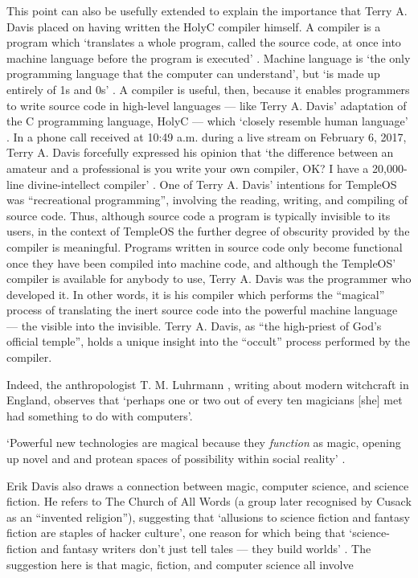 This point can also be usefully extended to explain
the importance that Terry A. Davis placed
on having written the HolyC compiler himself.
A compiler is a program which `translates a whole program, called the
source code, at once into machine language before the program is executed'
\parencite[323]{Computers}.
Machine language is `the only programming language that the computer can
understand', but `is made up entirely of 1s and 0s'
\parencite[321]{Computers}.
A compiler is useful, then, because it enables programmers to write
source code in high-level languages --- like Terry A. Davis' adaptation of the C
programming language, HolyC --- which `closely resemble human language'
\parencite[323]{Computers}.
In a phone call received at 10:49 a.m. during a live stream
on February 6, 2017, Terry A. Davis  forcefully expressed his opinion that
`the difference between an amateur and a professional is you write your
own compiler, OK? I have a 20,000-line divine-intellect compiler'
\parencite[31:44]{Telephone}.
One of Terry A. Davis' intentions for TempleOS was
``recreational programming'', involving the reading, writing,
and compiling of source code.
Thus, although source code a program is typically invisible to its users,
in the context of TempleOS the further degree of obscurity
provided by the compiler is meaningful.
Programs written in source code only become functional
once they have been compiled into machine code, and although the TempleOS'
compiler is available for anybody to use, Terry A. Davis was the programmer
who developed it.
In other words, it is his compiler which performs the ``magical'' process
of translating the inert source code into the powerful
machine language --- the visible into the invisible.
Terry A. Davis, as ``the high-priest of God's official temple'',
holds a unique insight into the ``occult'' process performed by the compiler.

Indeed, the anthropologist T. M. Luhrmann \parencite*[106]{Luhrmann89},
writing about modern witchcraft in England, observes that
`perhaps one or two out of every ten magicians [she] met
had something to do with computers'.




`Powerful new technologies are magical because they \textit{function}
as magic, opening up novel and and protean spaces of possibility
within social reality' \parencite[181]{Davis98}.

Erik Davis also draws a connection between magic, computer science,
and science fiction.
He refers to The Church of All Words (a group later recognised by Cusack as
an ``invented religion''), suggesting that `allusions to science fiction
and fantasy fiction are staples of hacker culture', one reason for which being
that `science-fiction and fantasy writers don't just tell tales --- they build
worlds' \parencite[182]{Davis98}.
The suggestion here is that magic, fiction, and computer science all involve

